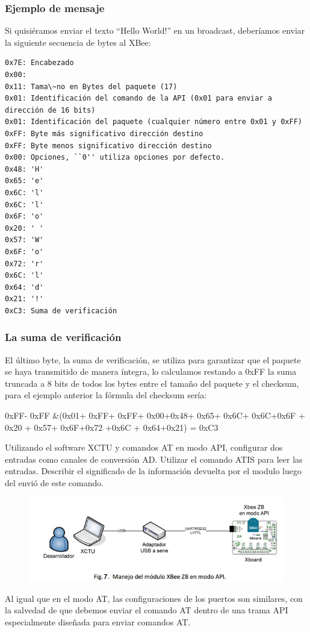\documentclass[11pt,oneside,spanish,a4paper]{article}
\begin{document}
\subsubsection{Ejemplo de mensaje}
Si quisiéramos enviar el texto ``Hello World!'' en un broadcast, deberíamos enviar la siguiente secuencia de bytes al XBee:
\begin{lstlisting}[emph={0x7E:,0x00:,0x11:,0x01:,0xFF:,0xFF:,0x00:,
0x48:,0x65:,0x6C:,0x6C:,0x6F:,0x20:,0x57:,0x6F:,0x72:,0x6C:,0x64:,0x21:,
0xC3}, emphstyle={\color{blue}}, label=code:apiEjempl-id]
0x7E: Encabezado
0x00:
0x11: Tama\~no en Bytes del paquete (17)
0x01: Identificación del comando de la API (0x01 para enviar a dirección de 16 bits)
0x01: Identificación del paquete (cualquier número entre 0x01 y 0xFF)
0xFF: Byte más significativo dirección destino
0xFF: Byte menos significativo dirección destino
0x00: Opciones, ``0'' utiliza opciones por defecto.
0x48: 'H'
0x65: 'e'
0x6C: 'l'
0x6C: 'l'
0x6F: 'o'
0x20: ' '
0x57: 'W'
0x6F: 'o'
0x72: 'r'
0x6C: 'l'
0x64: 'd'
0x21: '!'
0xC3: Suma de verificación
\end{lstlisting}  
\subsubsection{La suma de verificación}
El último byte, la suma de verificación, se utiliza para garantizar que el paquete se haya transmitido de manera íntegra, lo calculamos restando a 0xFF la suma truncada a 8 bits de todos los bytes entre el tamaño del paquete y el checksum, para el ejemplo anterior la fórmula del checksum sería:


0xFF- 0xFF \&(0x01+ 0xFF+ 0xFF+ 0x00+0x48+
0x65+ 0x6C+ 0x6C+0x6F + 0x20 +
0x57+ 0x6F+0x72 +0x6C + 0x64+0x21) = 0xC3


Utilizando el software XCTU y comandos AT en modo API, configurar dos entradas como canales de conversión AD. Utilizar el comando ATIS para leer las entradas. Describir el significado de la información devuelta por el modulo luego del envió de este comando.
\begin{figure}[ht]
	\centering
	\includegraphics[width=.6\textwidth]{img/IMAGEN07.jpg}
\end{figure}
Al igual que en el modo AT, las configuraciones de los puertos son similares, con la salvedad de que debemos enviar el comando AT dentro de una trama API especialmente diseñada para enviar comandos AT.
\end{document}
